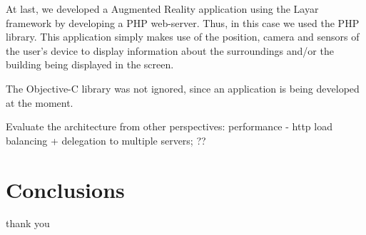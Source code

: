 \documentclass[times]{ettauth}
\begin{document}
At last, we developed a Augmented Reality application using the Layar framework by developing a PHP web-server. Thus, in this case we used the PHP library. This application simply makes use of the position, camera and sensors of the user's device to display information about the surroundings and/or the building being displayed in the screen.

The Objective-C library was not ignored, since an application is being developed at the moment.

Evaluate the architecture from other perspectives: performance - http load balancing + delegation to multiple servers; ??



\section{Conclusions}
\label{s:conclusions}

\acks
thank you



\end{document}
